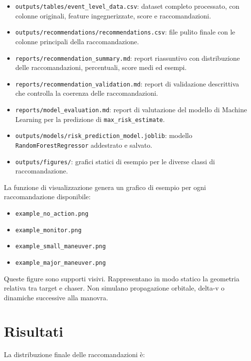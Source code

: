 \documentclass[12pt,a4paper]{article}
\begin{document}
\begin{itemize}
    \item \texttt{outputs/tables/event\_level\_data.csv}: dataset completo processato, con colonne originali, feature ingegnerizzate, score e raccomandazioni.
    \item \texttt{outputs/recommendations/recommendations.csv}: file pulito finale con le colonne principali della raccomandazione.
    \item \texttt{reports/recommendation\_summary.md}: report riassuntivo con distribuzione delle raccomandazioni, percentuali, score medi ed esempi.
    \item \texttt{reports/recommendation\_validation.md}: report di validazione descrittiva che controlla la coerenza delle raccomandazioni.
    \item \texttt{reports/model\_evaluation.md}: report di valutazione del modello di Machine Learning per la predizione di \texttt{max\_risk\_estimate}.
    \item \texttt{outputs/models/risk\_prediction\_model.joblib}: modello \texttt{RandomForestRegressor} addestrato e salvato.
    \item \texttt{outputs/figures/}: grafici statici di esempio per le diverse classi di raccomandazione.
\end{itemize}

La funzione di visualizzazione genera un grafico di esempio per ogni raccomandazione disponibile:

\begin{itemize}
    \item \texttt{example\_no\_action.png}
    \item \texttt{example\_monitor.png}
    \item \texttt{example\_small\_maneuver.png}
    \item \texttt{example\_major\_maneuver.png}
\end{itemize}

Queste figure sono supporti visivi. Rappresentano in modo statico la geometria relativa tra target e chaser. Non simulano propagazione orbitale, delta-v o dinamiche successive alla manovra.

\section{Risultati}

La distribuzione finale delle raccomandazioni è:
\end{document}

